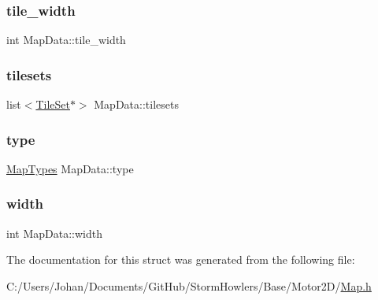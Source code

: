 \subsubsection{\texorpdfstring{tile\_width}{tile\_width}}
{\footnotesize\ttfamily int Map\+Data\+::tile\+\_\+width}

\mbox{\label{struct_map_data_a5d5439da88d6b7c15739837cf9e6258c}} 
\subsubsection{\texorpdfstring{tilesets}{tilesets}}
{\footnotesize\ttfamily list$<$\mbox{\hyperlink{struct_tile_set}{Tile\+Set}}$\ast$$>$ Map\+Data\+::tilesets}

\mbox{\label{struct_map_data_a766a4abeba6b2e2e51be1a4ca1539306}} 
\subsubsection{\texorpdfstring{type}{type}}
{\footnotesize\ttfamily \mbox{\hyperlink{_map_8h_a28c252fd678ff644cdad7b1b835f24c9}{Map\+Types}} Map\+Data\+::type}

\mbox{\label{struct_map_data_aae704f6b63b93580ab8affdbccc79dd0}} 
\subsubsection{\texorpdfstring{width}{width}}
{\footnotesize\ttfamily int Map\+Data\+::width}



The documentation for this struct was generated from the following file\+:\begin{DoxyCompactItemize}
\item 
C\+:/\+Users/\+Johan/\+Documents/\+Git\+Hub/\+Storm\+Howlers/\+Base/\+Motor2\+D/\mbox{\hyperlink{_map_8h}{Map.\+h}}\end{DoxyCompactItemize}
